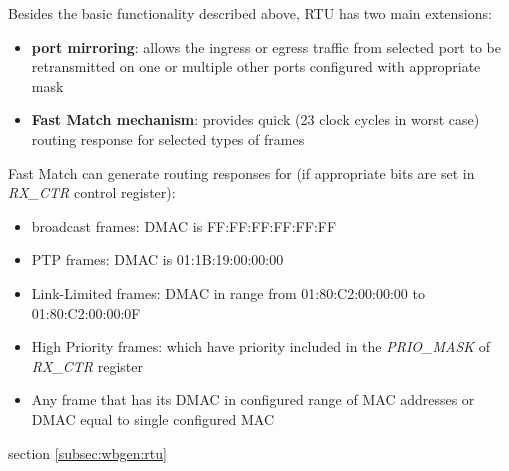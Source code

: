 Besides the basic functionality described above, RTU has two main extensions:
\begin{itemize}
  \item {\bf port mirroring}: allows the ingress or egress traffic from selected
    port to be retransmitted on one or multiple other ports configured with
    appropriate mask
  \item {\bf Fast Match mechanism}: provides quick (23 clock cycles in worst case)
    routing response for selected types of frames
\end{itemize}

Fast Match can generate routing responses for (if appropriate bits are set in
\emph{RX\_CTR} control register):
\begin{itemize}
  \item broadcast frames: DMAC is FF:FF:FF:FF:FF:FF
  \item PTP frames: DMAC is 01:1B:19:00:00:00
  \item Link-Limited frames: DMAC in range from 01:80:C2:00:00:00 to
    01:80:C2:00:00:0F
  \item High Priority frames: which have priority included in the
    \emph{PRIO\_MASK} of \emph{RX\_CTR} register
  \item Any frame that has its DMAC in configured range of MAC addresses or DMAC
    equal to single configured MAC
\end{itemize}

 section \ref{subsec:wbgen:rtu}\\
